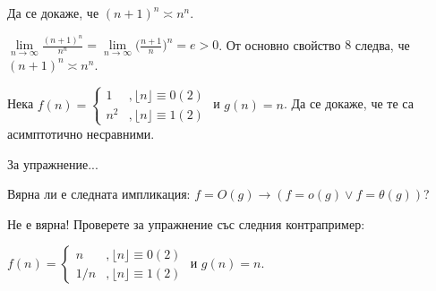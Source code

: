 \begin{problem}
	Да се докаже, че $(n+1)^n\asymp n^n$.
\end{problem}
\begin{solution}
	$\lim\limits_{n\to\infty}\frac{(n+1)^n}{n^n}=\lim\limits_{n\to\infty}\big(\frac{n+1}n\big)^n=e>0$.
	От основно свойство $\hyperref[mprop-1]{8}$ следва, че $(n+1)^n\asymp n^n$.
\end{solution}\leavevmode\newline

\begin{problem}
	Нека $f(n)=\begin{cases}
	1&,\lfloor n\rfloor\equiv0(2)\\
	n^2&,\lfloor n\rfloor\equiv1(2)
	\end{cases}$ и $g(n)=n$. Да се докаже, че те са асимптотично несравними.
\end{problem}
\begin{solution}
	За упражнение...
\end{solution}\leavevmode\newline

\begin{problem}
	Вярна ли е следната импликация: $f=O(g)\rightarrow(f=o(g)\lor f=\theta(g))$?
\end{problem}
\begin{solution}
	Не е вярна!	Проверете за упражнение със следния контрапример:
	
	\noindent
	$f(n)=\begin{cases}
	n&,\lfloor n\rfloor\equiv0(2)\\
	1/n&,\lfloor n\rfloor\equiv1(2)
	\end{cases}$ и $g(n)=n$.
\end{solution}\leavevmode\newline

